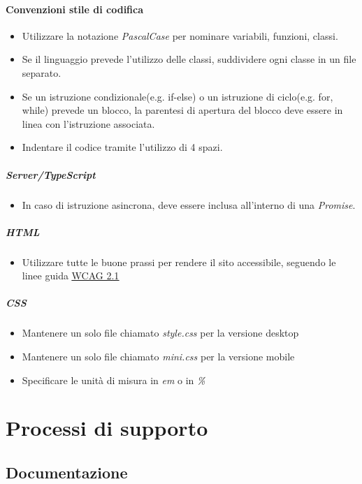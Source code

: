 \documentclass[a4paper, 12pt]{article}
\begin{document}
\paragraph{Convenzioni stile di codifica}
\begin{itemize}
	\item Utilizzare la notazione \textit{PascalCase} per nominare variabili, funzioni, classi.
	\item Se il linguaggio prevede l'utilizzo delle classi, suddividere ogni classe in un file separato.
	\item Se un istruzione condizionale(e.g. if-else) o un istruzione di ciclo(e.g. for, while) prevede un blocco,
	la parentesi di apertura del blocco deve essere in linea con l'istruzione associata.
	\item Indentare il codice tramite l'utilizzo di 4 spazi.
\end{itemize}
\subparagraph{Server/TypeScript}
\begin{itemize}
	\item In caso di istruzione asincrona, deve essere inclusa all'interno di una \textit{Promise}.
\end{itemize}
\subparagraph{HTML}
\begin{itemize}
	\item Utilizzare tutte le buone prassi per rendere il sito accessibile, seguendo le linee guida
	\href{https://www.w3.org/Translations/WCAG21-it/}{\underline{WCAG 2.1}}
\end{itemize}
\subparagraph{CSS}
	\begin{itemize}
		\item Mantenere un solo file chiamato \textit{style.css} per la versione desktop
		\item Mantenere un solo file chiamato \textit{mini.css} per la versione mobile
		\item Specificare le unità di misura in \textit{em} o in \textit{\%}
	\end{itemize}

\section{Processi di supporto}
\subsection{Documentazione}
\end{document}
